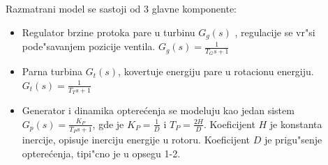 \documentclass[a4paper,11pt]{article}
\theoremstyle{definition} \newtheorem{deff}{Definicija}[section]
\theoremstyle{definition} \newtheorem{prim}[deff]{Primer}
\theoremstyle{plain} \newtheorem{teor}[deff]{Teorema}
\begin{document}
	\begin{table}[]
	\caption{Tabela parametara}
	\label{tab:parametri}
	\end{table}
	
	Razmatrani model se sastoji od 3 glavne komponente: 
	\begin{itemize}
		\item Regulator brzine protoka pare u turbinu $G_g(s)$ , regulacije se vr"si pode"savanjem pozicije ventila. $G_g(s) = \frac{1}{T_Gs+1}$
		\item Parna turbina $G_t(s)$, kovertuje energiju pare u rotacionu energiju. $G_t(s) = \frac{1}{T_Ts+1}$
		\item Generator i dinamika optere\'cenja se modeluju kao jedan sistem $G_p(s) = \frac{K_P}{T_Ps + 1}$, gde je $K_P = \frac{1}{D}$ i $T_P = \frac{2H}{D}$. Koeficijent $H$ je konstanta inercije, opisuje inerciju energije u rotoru. Koeficijent $D$ je prigu"senje optere\'cenja, tipi"cno je u opsegu 1-2.
	\end{itemize}
	
\end{document}

